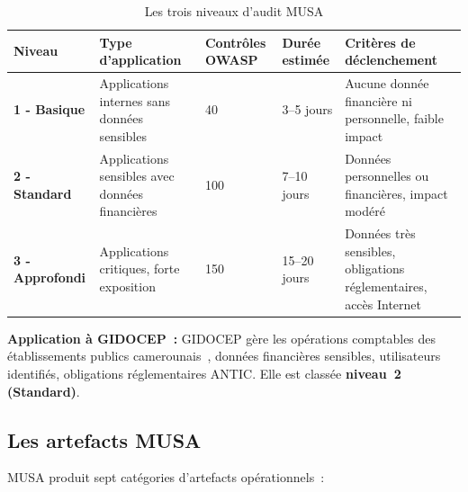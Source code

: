 \documentclass[12pt,a4paper,oneside]{report}
\begin{document}
\begin{table}[H]
\centering\small
\caption{Les trois niveaux d'audit MUSA}
\label{tab:niveaux_musa}
\begin{tabularx}{\textwidth}{p{2.5cm}p{3cm}p{2cm}p{2cm}X}
\toprule
\rowcolor{theadcolor}
\color{white}\textbf{Niveau} &
\color{white}\textbf{Type d'application} &
\color{white}\textbf{Contr\^oles OWASP} &
\color{white}\textbf{Dur\'ee estim\'ee} &
\color{white}\textbf{Crit\`eres de d\'eclenchement} \\
\midrule
\textbf{1 - Basique} & Applications internes sans donn\'ees sensibles &
  40 & 3--5 jours & Aucune donn\'ee financi\`ere ni personnelle, faible impact \\
\textbf{2 - Standard} & Applications sensibles avec donn\'ees financi\`eres &
  100 & 7--10 jours & Donn\'ees personnelles ou financi\`eres, impact mod\'er\'e \\
\textbf{3 - Approfondi} & Applications critiques, forte exposition &
  150 & 15--20 jours & Donn\'ees tr\`es sensibles, obligations r\'eglementaires, acc\`es Internet \\
\bottomrule
\end{tabularx}
\end{table}

\textbf{Application \`a GIDOCEP~:} GIDOCEP g\`ere les op\'erations comptables
des \'etablissements publics camerounais~, donn\'ees financi\`eres sensibles,
utilisateurs identifi\'es, obligations r\'eglementaires ANTIC. Elle est class\'ee
\textbf{niveau~2 (Standard)}.

\subsection{Les artefacts MUSA}

MUSA produit sept cat\'egories d'artefacts op\'erationnels~:
\end{document}
